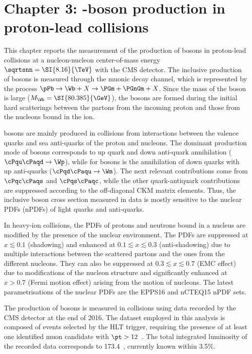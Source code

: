 \section{Chapter 3: \Wb-boson production in proton-lead collisions}

This chapter reports the measurement of the production of \Wb bosons in proton-lead collisions at a nucleon-nucleon center-of-mass energy $\sqrtsnn = \SI{8.16}{\TeV}$ with the CMS detector. The inclusive production of \Wb bosons is measured through the muonic decay channel, which is represented by the process $\pPb\to{\Wb + X}\to{\PGm + \PGnGm + X}$. Since the mass of the \Wb boson is large ($M_{\Wb} = \SI{80.385}{\GeV}$), the \Wb bosons are formed during the initial hard scatterings between the partons from the incoming proton and those from the nucleons bound in the \Pb ion.

\Wb bosons are mainly produced in \pPb collisions from interactions between the valence quarks and sea anti-quarks of the proton and nucleons. The dominant production mode of \Wp bosons corresponds to up quark and down anti-quark annihilation ($\cPqu\cPaqd\to\Wp$), while for \Wm bosons is the annihilation of down quarks with up anti-quarks ($\cPqd\cPaqu\to\Wm$). The next relevant contributions come from $\cPqc\cPaqs$ and $\cPqs\cPaqc$, while the other quark-antiquark contributions are suppressed according to the off-diagonal CKM matrix elements. Thus, the inclusive \Wb boson cross section measured in \RunpPb data is mostly sensitive to the nuclear PDFs (nPDFs) of light quarks and anti-quarks.

In heavy-ion collisions, the PDFs of protons and neutrons bound in a nucleus are modified by the presence of the nuclear environment. The PDFs are suppressed at $x \lesssim 0.1$ (shadowing) and enhanced at $0.1 \lesssim x \lesssim 0.3$ (anti-shadowing) due to multiple interactions between the scattered partons and the ones from the different nucleons. They can also be suppressed at $0.3 \lesssim x \lesssim 0.7$ (EMC effect) due to modifications of the nucleon structure and significantly enhanced at $x > 0.7$ (Fermi motion effect) arising from the motion of nucleons. The latest parametrisations of the nuclear PDFs are the EPPS16 and nCTEQ15 nPDF sets.

The production of \Wb bosons is measured in \RunpPb collisions using data recorded by the CMS detector at the end of 2016. The dataset employed in this analysis is composed of events selected by the HLT trigger, requiring the presence of at least one identified muon candidate with $\pt > 12$~\GeVc. The total integrated luminosity of the recorded data corresponds to 173.4~\nbinv, currently known within 3.5\%.

